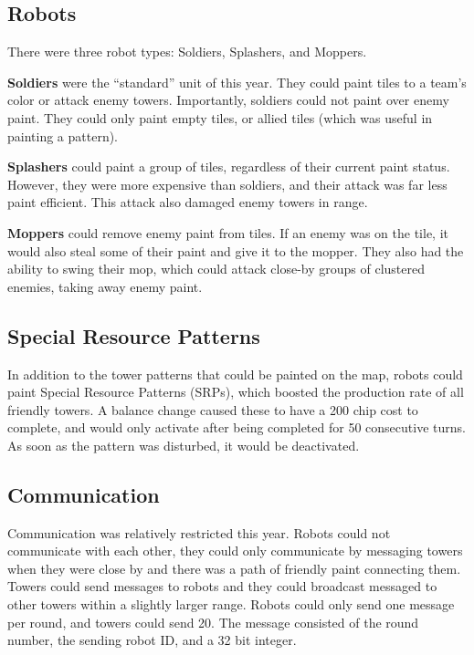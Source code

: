 \documentclass{article}
\begin{document}
  \subsection{Robots}

  There were three robot types: Soldiers, Splashers, and Moppers.

  \medskip

  \textbf{Soldiers} were the ``standard'' unit of this year. They could paint tiles to a team's color or attack enemy towers. Importantly, soldiers could not paint over enemy paint. They could only paint empty tiles, or allied tiles (which was useful in painting a pattern).

  \medskip

  \textbf{Splashers} could paint a group of tiles, regardless of their current paint status. However, they were more expensive than soldiers, and their attack was far less paint efficient. This attack also damaged enemy towers in range.

  \medskip

  \textbf{Moppers} could remove enemy paint from tiles. If an enemy was on the tile, it would also steal some of their paint and give it to the mopper. They also had the ability to swing their mop, which could attack close-by groups of clustered enemies, taking away enemy paint.

  \subsection{Special Resource Patterns}

  In addition to the tower patterns that could be painted on the map, robots could paint Special Resource Patterns (SRPs), which boosted the production rate of all friendly towers. A balance change caused these to have a 200 chip cost to complete, and would only activate after being completed for 50 consecutive turns. As soon as the pattern was disturbed, it would be deactivated.

  \subsection{Communication}

  Communication was relatively restricted this year. Robots could not communicate with each other, they could only communicate by messaging towers when they were close by and there was a path of friendly paint connecting them. Towers could send messages to robots and they could broadcast messaged to other towers within a slightly larger range. Robots could only send one message per round, and towers could send 20. The message consisted of the round number, the sending robot ID, and a 32 bit integer.
\end{document}
